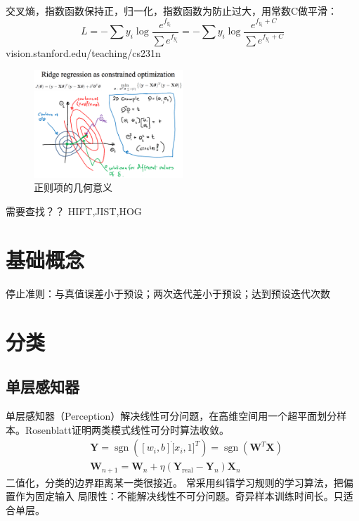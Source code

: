 \documentclass[UTF8]{article}
\DeclareMathOperator{\sgn}{sgn}
\begin{document}
交叉熵，指数函数保持正，归一化，指数函数为防止过大，用常数C做平滑：
\begin{equation}
\label{cross}
L=-\sum y_i \log \frac{e^{f_{y_i}}}{\sum e^{f_{y_i}}}
=-\sum y_i \log \frac{e^{f_{y_i}+C}}{\sum e^{f_{y_i}+C}}
\end{equation}
vision.stanford.edu/teaching/cs231n


\begin{figure}[h]
    \centering
    \includegraphics[width=0.5\textwidth]{Figures/regulation.eps}
    \caption{正则项的几何意义}
    \label{fig:1}
\end{figure}




需要查找？？ HIFT,JIST,HOG

\section{基础概念}
停止准则：与真值误差小于预设；两次迭代差小于预设；达到预设迭代次数

\section{分类}
\subsection{单层感知器}
单层感知器（Perception）解决线性可分问题，在高维空间用一个超平面划分样本。Rosenblatt证明两类模式线性可分时算法收敛。
\begin{equation}
\label{perception}
\begin{split}
&\boldsymbol Y = \sgn \left( [w_i,b] \dot [x_i,1]^T \right)=\sgn(\boldsymbol W^T \boldsymbol X)\\
&\boldsymbol W_{n+1}=\boldsymbol W_n + \eta (\boldsymbol Y_{\text{real} } -\boldsymbol Y_n ) \boldsymbol X_n 
\end{split}
\end{equation}
二值化，分类的边界距离某一类很接近。
常采用纠错学习规则的学习算法，把偏置作为固定输入
局限性：不能解决线性不可分问题。奇异样本训练时间长。只适合单层。
\end{document}
